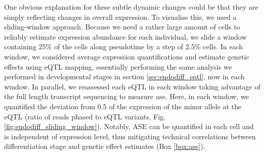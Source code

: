 One obvious explanation for these subtle dynamic changes could be that they are simply reflecting changes in overall expression. 
To visualise this,
we used a sliding-window approach. 
Because we need a rather large amount of cells to reliably estimate expression abundance for each individual, we slide a window containing 25\% of the cells along pseudotime by a step of 2.5\% cells.
In each window, we considered average expression quantifications and estimate genetic effects using eQTL mapping, essentially performing the same analysis we performed in developmental stages in section \ref{sec:endodiff_eqtl}, now in each window.
In parallel, we reassessed each eQTL in each window taking advantage of the full length transcript sequencing to measure \gls{ase}.
Here, in each window, we quantified the deviation from 0.5 of the expression of the minor allele at the eQTL (ratio of reads phased to eQTL variants, Fig. \ref{fig:endodiff_sliding_window}). 
Notably, ASE can be quantified in each cell and is independent of expression level, thus mitigating technical correlations between differentiation stage and genetic effect estimates (Box \ref{box:ase}). 


\newpage

